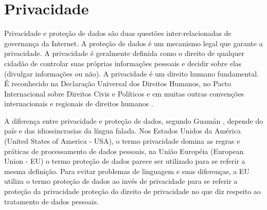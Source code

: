 \chapter{Privacidade}
\label{cap:privacidade}




Privacidade e proteção de dados são duas questões inter-relacionadas de governança da Internet. A proteção de dados é um mecanismo legal que garante a privacidade. A privacidade é geralmente definida como o direito de qualquer cidadão de controlar suas próprias informações pessoais e decidir sobre elas (divulgar informações ou não). A privacidade é um direito humano fundamental. É reconhecido na Declaração Universal dos Direitos Humanos, no Pacto Internacional sobre Direitos Civis e Políticos e em muitas outras convenções internacionais e regionais de direitos humanos \cite{PrivacyA6:online}. 

A diferença entre privacidade e proteção de dados, segundo Guamán \cite{Privacyv4:online}, depende do país e das idiossincrasias da língua falada. Nos Estados Unidos da América (United States of America - USA), o termo privacidade domina as regras e práticas de processamento de dados pessoais, na União Européia (European Union - EU) o termo proteção de dados parece ser utilizado para se referir a mesma definição. Para evitar problemas de linguagem e suas diferenças, a EU utiliza o termo proteção de dados ao invés de privacidade para se referir a proteção da privacidade proteção do direito de privacidade no que diz respeito ao tratamento de dados pessoais.

